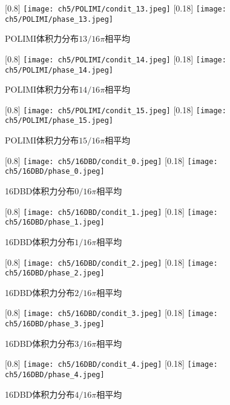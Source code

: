 \begin{figure}
  \centering
  [0.8\textwidth]
    {\texttt{[image: ch5/POLIMI/condit\_13.jpeg]}}
  [0.18\textwidth]
    {\texttt{[image: ch5/POLIMI/phase\_13.jpeg]}}
  \caption{POLIMI体积力分布$13/16\pi$相平均}
\end{figure}
\begin{figure}
  \centering
  [0.8\textwidth]
    {\texttt{[image: ch5/POLIMI/condit\_14.jpeg]}}
  [0.18\textwidth]
    {\texttt{[image: ch5/POLIMI/phase\_14.jpeg]}}
  \caption{POLIMI体积力分布$14/16\pi$相平均}
\end{figure}
\begin{figure}
  \centering
  [0.8\textwidth]
    {\texttt{[image: ch5/POLIMI/condit\_15.jpeg]}}
  [0.18\textwidth]
    {\texttt{[image: ch5/POLIMI/phase\_15.jpeg]}}
  \caption{POLIMI体积力分布$15/16\pi$相平均}
\end{figure}
\begin{figure}
  \centering
  [0.8\textwidth]
    {\texttt{[image: ch5/16DBD/condit\_0.jpeg]}}
  [0.18\textwidth]
    {\texttt{[image: ch5/16DBD/phase\_0.jpeg]}}
  \caption{16DBD体积力分布$0/16\pi$相平均}
\end{figure}
\begin{figure}
  \centering
  [0.8\textwidth]
    {\texttt{[image: ch5/16DBD/condit\_1.jpeg]}}
  [0.18\textwidth]
    {\texttt{[image: ch5/16DBD/phase\_1.jpeg]}}
  \caption{16DBD体积力分布$1/16\pi$相平均}
\end{figure}
\begin{figure}
  \centering
  [0.8\textwidth]
    {\texttt{[image: ch5/16DBD/condit\_2.jpeg]}}
  [0.18\textwidth]
    {\texttt{[image: ch5/16DBD/phase\_2.jpeg]}}
  \caption{16DBD体积力分布$2/16\pi$相平均}
\end{figure}
\begin{figure}
  \centering
  [0.8\textwidth]
    {\texttt{[image: ch5/16DBD/condit\_3.jpeg]}}
  [0.18\textwidth]
    {\texttt{[image: ch5/16DBD/phase\_3.jpeg]}}
  \caption{16DBD体积力分布$3/16\pi$相平均}
\end{figure}
\begin{figure}
  \centering
  [0.8\textwidth]
    {\texttt{[image: ch5/16DBD/condit\_4.jpeg]}}
  [0.18\textwidth]
    {\texttt{[image: ch5/16DBD/phase\_4.jpeg]}}
  \caption{16DBD体积力分布$4/16\pi$相平均}
\end{figure}
